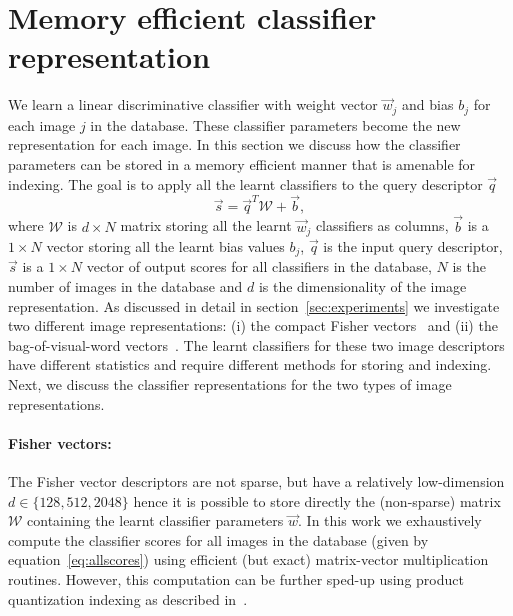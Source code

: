   \section{Memory efficient classifier representation}  
  \label{sec:memory}
    We learn a linear discriminative classifier with weight vector $\vec{w}_j$ and bias $b_j$ for each image $j$ in the database.   
    These classifier parameters become the new representation for each image. 
    In this section we discuss how the classifier parameters can be stored in a memory efficient manner that is amenable for indexing. 
    The goal is to apply all the learnt classifiers to the query descriptor $\vec{q}$
        \begin{equation}
        \label{eq:allscores}
          \vec{s}=\vec{q}^T \mathcal{W}+\vec{b}, %
        \end{equation}
    where $\mathcal{W}$ is $d\times N$ matrix storing all the learnt $\vec{w}_j$ classifiers as columns, $\vec{b}$ is a $1\times N$ vector storing all the learnt bias values $b_j$, 
    $\vec{q}$ is the input query descriptor, $\vec{s}$ is a $1\times N$ vector of output scores for all classifiers in the database, $N$ is the number of images in the database  and $d$ is the dimensionality of the image representation. 
    As discussed in detail in section~\ref{sec:experiments} we investigate two different image representations:   (i) the compact Fisher vectors~\cite{Jegou12} and (ii) the bag-of-visual-word vectors~\cite{Sivic03}. The learnt classifiers for these two image descriptors have different statistics and require different methods for storing and indexing. Next, we discuss the classifier representations for the two types of image representations.
 
  \paragraph{Fisher vectors:}    
    The Fisher vector descriptors are not sparse, but have a relatively low-dimension $d\in\{128, 512, 2048\}$ hence it is possible to store directly the (non-sparse) matrix $\mathcal{W}$ containing the learnt classifier parameters $\vec{w}$. In this work we exhaustively compute the classifier scores for all images in the database (given by equation~\eqref{eq:allscores}) using efficient (but exact) matrix-vector multiplication routines. However, this computation can be further sped-up using product quantization indexing as described in~\cite{Jegou11}.     

